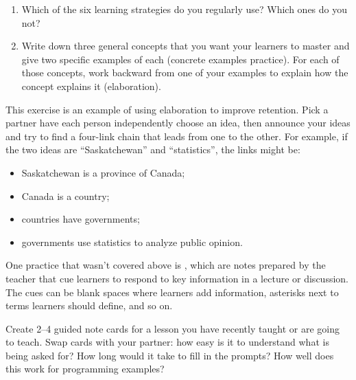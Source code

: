 

\begin{enumerate}

\item
  Which of the six learning strategies do you regularly use?
  Which ones do you not?

\item
  Write down three general concepts that you want your learners to   master
  and give two specific examples of each
  (concrete examples practice).
  For each of those concepts,
  work backward from one of your examples to explain how the concept explains it
  (elaboration).

\end{enumerate}


This exercise is an example of using elaboration to improve retention.
Pick a partner
have each person independently choose an idea,
then announce your ideas and try to find a four-link chain
that leads from one to the other.
For example,
if the two ideas are ``Saskatchewan'' and ``statistics'',
the links might be:

\begin{itemize}

\item
  Saskatchewan is a province of Canada;

\item
  Canada is a country;

\item
  countries have governments;

\item
  governments use statistics to analyze public opinion.

\end{itemize}


One practice that wasn't covered above is ,
which are notes prepared by the teacher
that cue learners to respond to key information in a lecture or discussion.
The cues can be blank spaces where learners add information,
asterisks next to terms learners should define,
and so on.

Create 2--4 guided note cards for a lesson you have recently taught
or are going to teach.
Swap cards with your partner:
how easy is it to understand what is being asked for?
How long would it take to fill in the prompts?
How well does this work for programming examples?

